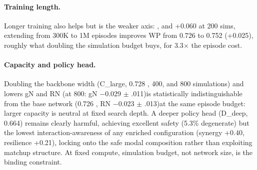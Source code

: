 \documentclass[journal]{IEEEtran}
\providecommand{\DIFaddtex}[1]{{\protect\color{blue} \sf #1}} %
\providecommand{\DIFdeltex}[1]{{\protect\color{red} \scriptsize #1}} %
\providecommand{\DIFaddbegin}{} %
\providecommand{\DIFaddend}{} %
\providecommand{\DIFdelbegin}{} %
\providecommand{\DIFdelend}{} %
\providecommand{\DIFadd}[1]{\texorpdfstring{\DIFaddtex{#1}}{#1}} %
\providecommand{\DIFdel}[1]{\texorpdfstring{\DIFdeltex{#1}}{}} %
\begin{document}
\paragraph{\DIFdel{Training length.}} %
\addtocounter{paragraph}{-1}%
\DIFdel{Longer training also helps but is the weaker axis: }\DIFdelend \DIFaddbegin \DIFadd{0.045, and +0.060 }\DIFaddend at 200\DIFdelbegin \DIFdel{sims, extending from 300K to 1M episodes improves WP from 0.726 to 0.752 (+0.025), roughly what doubling the simulation budget buys, for 3.3$\times$ the episode cost.
}%

\paragraph{\DIFdel{Capacity and policy head.}} %
\addtocounter{paragraph}{-1}%
\DIFdel{Doubling the backbone width (C\_large, 0.728}\DIFdelend \DIFaddbegin \DIFadd{, 400, and 800 simulations) and lowers gN and RN (at 800: gN $-$0.029 }\DIFaddend $\pm$ \DIFdelbegin \DIFdel{.011)is statistically indistinguishable from the base network (0.726}\DIFdelend \DIFaddbegin \DIFadd{0.006, RN $-$0.023 }\DIFaddend $\pm$ \DIFdelbegin \DIFdel{.013)at the same episode budget: larger capacity is neutral at fixed search depth. A deeper policy head (D\_deep, 0.664) remains clearly harmful, achieving excellent safety (5.3\% degenerate) but the lowest interaction-awareness of any enriched configuration (synergy +0.40, resilience +0.21), locking onto the safe modal composition rather than exploiting matchup structure. At fixed compute, simulation budget, not network size, is the binding constraint.
}%

\end{document}
